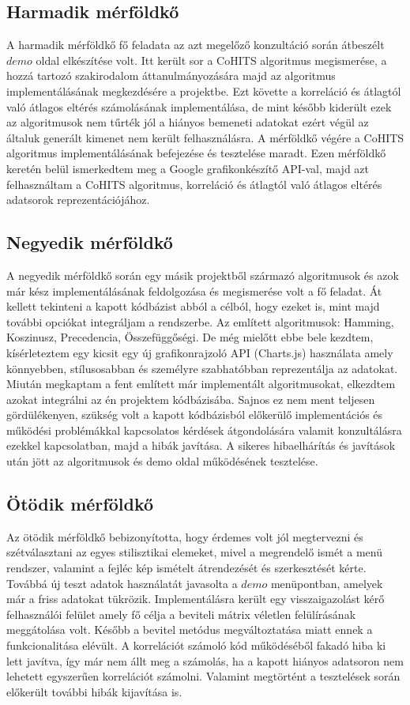 \documentclass[12pt]{report}
\theoremstyle{definition}
\begin{document}
	\subsection{Harmadik mérföldkő}A harmadik mérföldkő fő feladata az azt megelőző konzultáció során átbeszélt $demo$ oldal elkészítése volt. Itt került sor a CoHITS algoritmus megismerése, a hozzá tartozó szakirodalom áttanulmányozására majd az algoritmus implementálásának megkezdésére a projektbe. Ezt követte a korreláció és átlagtól való átlagos eltérés számolásának implementálása, de mint később kiderült ezek az algoritmusok nem tűrték jól a hiányos bemeneti adatokat ezért végül az általuk generált kimenet nem került felhasználásra. A mérföldkő végére a CoHITS algoritmus implementálásának befejezése és tesztelése maradt. Ezen mérföldkő keretén belül ismerkedtem meg a Google grafikonkészítő API-val, majd azt felhasználtam a CoHITS algoritmus, korreláció és átlagtól való átlagos eltérés adatsorok reprezentációjához.
	
	\subsection{Negyedik mérföldkő}A negyedik mérföldkő során egy másik projektből\cite{Borkostolas projekt} származó algoritmusok és azok már kész implementálásának feldolgozása és megismerése volt a fő feladat. Át kellett tekinteni a kapott kódbázist abból a célból, hogy ezeket is, mint majd további opciókat integráljam a rendszerbe. Az említett algoritmusok: Hamming, Koszinusz, Precedencia, Összefüggőségi. De még mielőtt ebbe bele kezdtem, kísérleteztem egy kicsit egy új grafikonrajzoló API (Charts.js) használata amely könnyebben, stílusosabban és személyre szabhatóbban reprezentálja az adatokat. Miután megkaptam a fent említett már implementált algoritmusokat, elkezdtem azokat integrálni az én projektem kódbázisába. Sajnos ez nem ment teljesen gördülékenyen, szükség volt a kapott kódbázisból előkerülő implementációs és működési problémákkal kapcsolatos kérdések átgondolására valamit konzultálásra ezekkel kapcsolatban, majd a hibák javítása. A sikeres hibaelhárítás és javítások után jött az algoritmusok és demo oldal működésének tesztelése.
	
	\subsection{Ötödik mérföldkő}Az ötödik mérföldkő bebizonyította, hogy érdemes volt jól megtervezni és szétválasztani az egyes stilisztikai elemeket, mivel a megrendelő ismét a menü rendszer, valamint a fejléc kép ismételt átrendezését és szerkesztését kérte. Továbbá új teszt adatok használatát javasolta a $demo$ menüpontban, amelyek már a friss adatokat tükrözik. Implementálásra került egy visszaigazolást kérő felhasználói felület amely fő célja a beviteli mátrix véletlen felülírásának meggátolása volt. Később a bevitel metódus megváltoztatása miatt ennek a funkcionalitása elévült. A korrelációt számoló kód működéséből fakadó hiba ki lett javítva, így már nem állt meg a számolás, ha a kapott hiányos adatsoron nem lehetett egyszerűen korrelációt számolni. Valamint megtörtént a tesztelések során előkerült további hibák kijavítása is.
	
\end{document}
